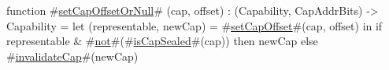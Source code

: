 function #\hyperref[sailRISCVzsetCapOffsetOrNull]{setCapOffsetOrNull}# (cap, offset) : (Capability, CapAddrBits) -> Capability =
    let (representable, newCap) = #\hyperref[sailRISCVzsetCapOffset]{setCapOffset}#(cap, offset) in
    if representable & #\hyperref[sailRISCVznot]{not}#(#\hyperref[sailRISCVzisCapSealed]{isCapSealed}#(cap)) then newCap else #\hyperref[sailRISCVzinvalidateCap]{invalidateCap}#(newCap)
